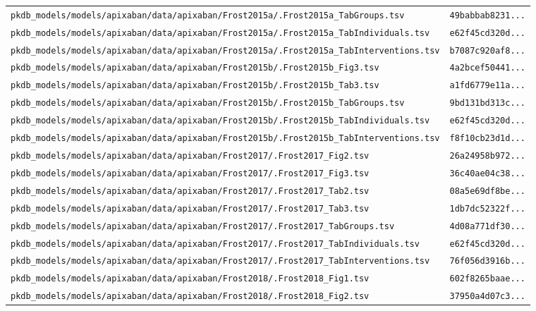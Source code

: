 \documentclass{article}
\begin{document}
\begin{longtable}{ll}
\texttt{pkdb\_models/models/apixaban/data/apixaban/Frost2015a/.Frost2015a\_TabGroups.tsv} & \texttt{49babbab8231...} \\
\texttt{pkdb\_models/models/apixaban/data/apixaban/Frost2015a/.Frost2015a\_TabIndividuals.tsv} & \texttt{e62f45cd320d...} \\
\texttt{pkdb\_models/models/apixaban/data/apixaban/Frost2015a/.Frost2015a\_TabInterventions.tsv} & \texttt{b7087c920af8...} \\
\texttt{pkdb\_models/models/apixaban/data/apixaban/Frost2015b/.Frost2015b\_Fig3.tsv} & \texttt{4a2bcef50441...} \\
\texttt{pkdb\_models/models/apixaban/data/apixaban/Frost2015b/.Frost2015b\_Tab3.tsv} & \texttt{a1fd6779e11a...} \\
\texttt{pkdb\_models/models/apixaban/data/apixaban/Frost2015b/.Frost2015b\_TabGroups.tsv} & \texttt{9bd131bd313c...} \\
\texttt{pkdb\_models/models/apixaban/data/apixaban/Frost2015b/.Frost2015b\_TabIndividuals.tsv} & \texttt{e62f45cd320d...} \\
\texttt{pkdb\_models/models/apixaban/data/apixaban/Frost2015b/.Frost2015b\_TabInterventions.tsv} & \texttt{f8f10cb23d1d...} \\
\texttt{pkdb\_models/models/apixaban/data/apixaban/Frost2017/.Frost2017\_Fig2.tsv} & \texttt{26a24958b972...} \\
\texttt{pkdb\_models/models/apixaban/data/apixaban/Frost2017/.Frost2017\_Fig3.tsv} & \texttt{36c40ae04c38...} \\
\texttt{pkdb\_models/models/apixaban/data/apixaban/Frost2017/.Frost2017\_Tab2.tsv} & \texttt{08a5e69df8be...} \\
\texttt{pkdb\_models/models/apixaban/data/apixaban/Frost2017/.Frost2017\_Tab3.tsv} & \texttt{1db7dc52322f...} \\
\texttt{pkdb\_models/models/apixaban/data/apixaban/Frost2017/.Frost2017\_TabGroups.tsv} & \texttt{4d08a771df30...} \\
\texttt{pkdb\_models/models/apixaban/data/apixaban/Frost2017/.Frost2017\_TabIndividuals.tsv} & \texttt{e62f45cd320d...} \\
\texttt{pkdb\_models/models/apixaban/data/apixaban/Frost2017/.Frost2017\_TabInterventions.tsv} & \texttt{76f056d3916b...} \\
\texttt{pkdb\_models/models/apixaban/data/apixaban/Frost2018/.Frost2018\_Fig1.tsv} & \texttt{602f8265baae...} \\
\texttt{pkdb\_models/models/apixaban/data/apixaban/Frost2018/.Frost2018\_Fig2.tsv} & \texttt{37950a4d07c3...} \\

\end{longtable}
\end{document}
